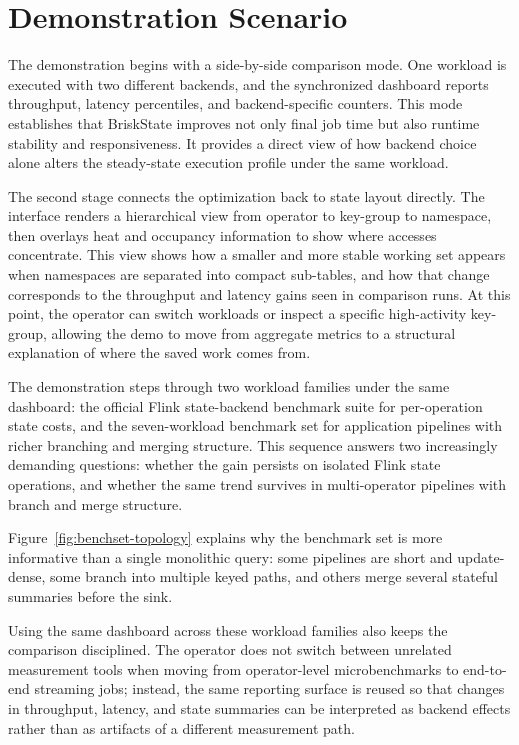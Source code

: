 \documentclass[sigconf,nonacm]{acmart}
\begin{document}
\section{Demonstration Scenario}
The demonstration begins with a side-by-side comparison mode. One workload is executed with two different backends, and the synchronized dashboard reports throughput, latency percentiles, and backend-specific counters. This mode establishes that BriskState improves not only final job time but also runtime stability and responsiveness. It provides a direct view of how backend choice alone alters the steady-state execution profile under the same workload.

The second stage connects the optimization back to state layout directly. The interface renders a hierarchical view from operator to key-group to namespace, then overlays heat and occupancy information to show where accesses concentrate. This view shows how a smaller and more stable working set appears when namespaces are separated into compact sub-tables, and how that change corresponds to the throughput and latency gains seen in comparison runs. At this point, the operator can switch workloads or inspect a specific high-activity key-group, allowing the demo to move from aggregate metrics to a structural explanation of where the saved work comes from.

The demonstration steps through two workload families under the same dashboard: the official Flink state-backend benchmark suite for per-operation state costs, and the seven-workload benchmark set for application pipelines with richer branching and merging structure. This sequence answers two increasingly demanding questions: whether the gain persists on isolated Flink state operations, and whether the same trend survives in multi-operator pipelines with branch and merge structure.

Figure~\ref{fig:benchset-topology} explains why the benchmark set is more informative than a single monolithic query: some pipelines are short and update-dense, some branch into multiple keyed paths, and others merge several stateful summaries before the sink.

Using the same dashboard across these workload families also keeps the comparison disciplined. The operator does not switch between unrelated measurement tools when moving from operator-level microbenchmarks to end-to-end streaming jobs; instead, the same reporting surface is reused so that changes in throughput, latency, and state summaries can be interpreted as backend effects rather than as artifacts of a different measurement path.
\end{document}

